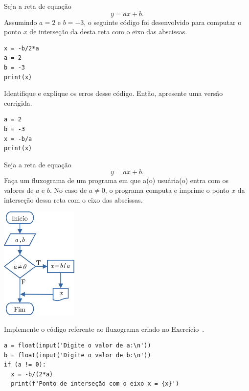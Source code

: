 
\begin{exer}
  Seja a reta de equação
  \begin{equation}
    y = ax + b.
  \end{equation}
  Assumindo $a=2$ e $b=-3$, o seguinte código foi desenvolvido para computar o ponto $x$ de interseção da desta reta com o eixo das abscissas.

\begin{lstlisting}
x = -b/2*a
a = 2
b = -3
print(x)
\end{lstlisting}

Identifique e explique os erros desse código. Então, apresente uma versão corrigida.
\end{exer}
\begin{resp}

\begin{lstlisting}
a = 2
b = -3
x = -b/a
print(x)
\end{lstlisting}

\end{resp}

\begin{exer}\label{cap_progest_sec_est:exer:ramifica_reta}
  Seja a reta de equação
  \begin{equation}
    y = ax + b.
  \end{equation}
  Faça um fluxograma de um programa em que a(o) usuária(o) entra com os valores de $a$ e $b$. No caso de $a\neq 0$, o programa computa e imprime o ponto $x$ da interseção dessa reta com o eixo das abscissas.
\end{exer}
\begin{resp}

\includegraphics[width=1.5in]{cap_progest/dados/fig_exer_ramifica_reta/fig.png}
  
\end{resp}

\begin{exer}
  Implemente o código referente ao fluxograma criado no Exercício~.
\end{exer}
\begin{resp}

\begin{lstlisting}
a = float(input('Digite o valor de a:\n'))
b = float(input('Digite o valor de b:\n'))
if (a != 0):
  x = -b/(2*a)
  print(f'Ponto de interseção com o eixo x = {x}')
\end{lstlisting}

\end{resp}

